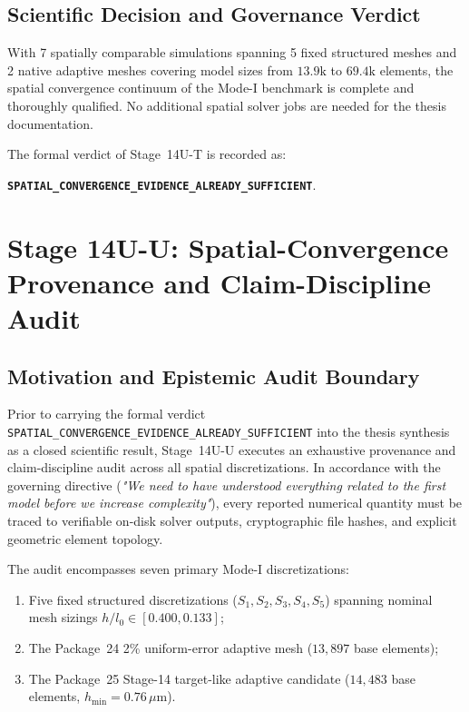 \subsection{Scientific Decision and Governance Verdict}
\label{subsec:stage14ut_verdict}

With 7 spatially comparable simulations spanning 5 fixed structured meshes and 2 native adaptive meshes covering model sizes from $13.9\mathrm{k}$ to $69.4\mathrm{k}$ elements, the spatial convergence continuum of the Mode-I benchmark is complete and thoroughly qualified. No additional spatial solver jobs are needed for the thesis documentation.

The formal verdict of Stage~14U-T is recorded as:
\begin{center}
{\footnotesize\textbf{\texttt{SPATIAL\_CONVERGENCE\_EVIDENCE\_ALREADY\_SUFFICIENT}}}.
\end{center}

\section{Stage 14U-U: Spatial-Convergence Provenance and Claim-Discipline Audit}
\label{sec:stage14uu_spatial_provenance_audit}

\subsection{Motivation and Epistemic Audit Boundary}
\label{subsec:stage14uu_motivation}

Prior to carrying the formal verdict \texttt{SPATIAL\_CONVERGENCE\_EVIDENCE\_ALREADY\_SUFFICIENT} into the thesis synthesis as a closed scientific result, Stage~14U-U executes an exhaustive provenance and claim-discipline audit across all spatial discretizations. In accordance with the governing directive (\textit{"We need to have understood everything related to the first model before we increase complexity"}), every reported numerical quantity must be traced to verifiable on-disk solver outputs, cryptographic file hashes, and explicit geometric element topology.

The audit encompasses seven primary Mode-I discretizations:
\begin{enumerate}
    \item Five fixed structured discretizations ($S_1, S_2, S_3, S_4, S_5$) spanning nominal mesh sizings $h/l_0 \in [0.400, 0.133]$;
    \item The Package~24 2\% uniform-error adaptive mesh ($13{,}897$ base elements);
    \item The Package~25 Stage-14 target-like adaptive candidate ($14{,}483$ base elements, $h_{\min} = 0.76\,\mu\mathrm{m}$).
\end{enumerate}

